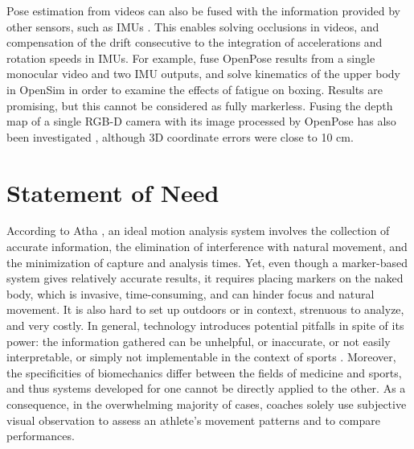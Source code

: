 Pose estimation from videos can also be fused with the information provided by other sensors, such as IMUs \cite{Bao2022, Zhang2020}. This enables solving occlusions in videos, and compensation of the drift consecutive to the integration of accelerations and rotation speeds in IMUs. For example, \cite{Haralabidis2020} fuse OpenPose results from a single monocular video and two IMU outputs, and solve kinematics of the upper body in OpenSim in order to examine the effects of fatigue on boxing. Results are promising, but this cannot be considered as fully markerless. Fusing the depth map of a single RGB-D camera with its image processed by OpenPose has also been investigated \cite{Liu2022c}, although 3D coordinate errors were close to 10 cm.

\medskip

\newpage
\section{Statement of Need}\label{sec:statement of need}

According to Atha \cite{Atha1984}, an ideal motion analysis system involves the collection of accurate information, the elimination of interference with natural movement, and the minimization of capture and analysis times. Yet, even though a marker-based system gives relatively accurate results, it requires placing markers on the naked body, which is invasive, time-consuming, and can hinder focus and natural movement. It is also hard to set up outdoors or in context, strenuous to analyze, and very costly. In general, technology introduces potential pitfalls in spite of its power: the information gathered can be unhelpful, or inaccurate, or not easily interpretable, or simply not implementable in the context of sports \cite{Windt2020}. Moreover, the specificities of biomechanics differ between the fields of medicine and sports, and thus systems developed for one cannot be directly applied to the other. As a consequence, in the overwhelming majority of cases, coaches solely use subjective visual observation to assess an athlete's movement patterns and to compare performances. 

